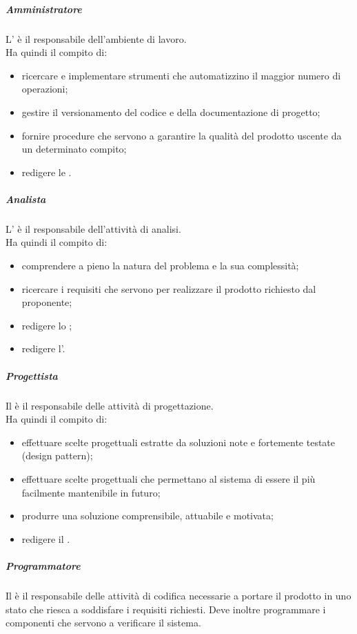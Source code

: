 				\subparagraph{Amministratore}
				L'\roleAdministrator{} è il responsabile dell'ambiente di lavoro. \\
				Ha quindi il compito di:
					\begin{itemize}
						\item ricercare e implementare strumenti che automatizzino il maggior numero di operazioni;
						\item gestire il versionamento del codice e della documentazione di progetto;
						\item fornire procedure che servono a garantire la qualità del prodotto uscente da un determinato compito;
						\item redigere le \docNameVersionNdP.
					\end{itemize}
				\subparagraph{Analista}
				L'\roleAnalyst{} è il responsabile dell'attività di analisi.\\
				Ha quindi il compito di:
					\begin{itemize}
						\item comprendere a pieno la natura del problema e la sua complessità;
						\item ricercare i requisiti che servono per realizzare il prodotto richiesto dal proponente\gloss{};
						\item redigere lo \docNameVersionSdF;
						\item redigere l'\docNameVersionAdR.
					\end{itemize}
				\subparagraph{Progettista}
				Il \roleDesigner{} è il responsabile delle attività di progettazione. \\
				Ha quindi il compito di:
					\begin{itemize}
						\item effettuare scelte progettuali estratte da soluzioni note e fortemente testate (design pattern\gloss{});
						\item effettuare scelte progettuali che permettano al sistema di essere il più facilmente mantenibile in futuro;
						\item produrre una soluzione comprensibile, attuabile e motivata;
						\item redigere il \docNameVersionPdQ.
					\end{itemize}
				\subparagraph{Programmatore}
				Il \roleProgrammer{} è il responsabile delle attività di codifica necessarie a portare il prodotto in uno stato che riesca a soddisfare i requisiti richiesti. Deve inoltre programmare i componenti che servono a verificare il sistema. \\
